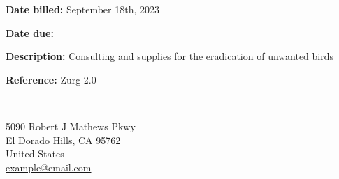 
\outputinvoicenum %

\begin{minipage}[t]{0.5\textwidth}
	\textbf{Date billed:} September 18th, 2023
	
	\textbf{Date due:}  %
	
	\textbf{Description:} Consulting and supplies for the eradication of unwanted birds
	
	\textbf{Reference:} Zurg 2.0
\end{minipage}
\begin{minipage}[t]{0.15\textwidth}
	~ %
\end{minipage}
\begin{minipage}[t]{0.35\textwidth}
	
	5090 Robert J Mathews Pkwy\\ %
	El Dorado Hills, CA 95762 \\
	United States \\
	\href{mailto:example@email.com}{example@email.com} %
\end{minipage}







